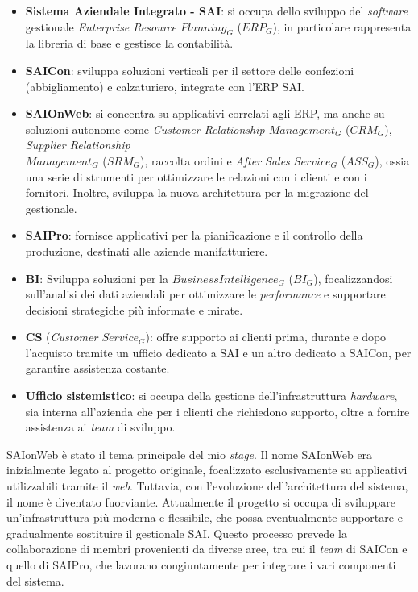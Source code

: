     \begin{itemize}
        \item \textbf{Sistema Aziendale Integrato - SAI}: si occupa dello sviluppo del \textit{software} gestionale \textit{Enterprise Resource $Planning_G$} ($ERP_G$), in particolare rappresenta la libreria di base e gestisce la contabilità.
        \item \textbf{SAICon}: sviluppa soluzioni verticali per il settore delle confezioni (abbigliamento) e calzaturiero, integrate con l'ERP SAI.
        \item \textbf{SAIOnWeb}: si concentra su applicativi correlati agli ERP, ma anche su soluzioni autonome come \textit{Customer Relationship $Management_G$} ($CRM_G$), \textit{Supplier Relationship \\
        $Management_G$} ($SRM_G$), raccolta ordini e \textit{After Sales $Service_G$} ($ASS_G$), ossia una serie di strumenti per ottimizzare le relazioni con i clienti e con i fornitori. Inoltre, sviluppa la nuova architettura per la migrazione del gestionale.
        \item \textbf{SAIPro}: fornisce applicativi per la pianificazione e il controllo della produzione, destinati alle aziende manifatturiere.
        \item \textbf{BI}: Sviluppa soluzioni per la \textit{$Business Intelligence_G$} ($BI_G$), focalizzandosi sull'analisi dei dati aziendali per ottimizzare le \textit{performance} e supportare decisioni strategiche più informate e mirate. 
        \item \textbf{CS} (\textit{Customer $Service_G$}): offre supporto ai clienti prima, durante e dopo l'acquisto tramite un ufficio dedicato a SAI e un altro dedicato a SAICon, per garantire assistenza costante.
        \item \textbf{Ufficio sistemistico}: si occupa della gestione dell'infrastruttura \textit{hardware}, sia interna all'azienda che per i clienti che richiedono supporto, oltre a fornire assistenza ai \textit{team} di sviluppo.
    \end{itemize}
    
    \noindent SAIonWeb è stato il tema principale del mio \textit{stage}. Il nome SAIonWeb era inizialmente legato al progetto originale, focalizzato esclusivamente su applicativi utilizzabili tramite il \textit{web}. Tuttavia, con l'evoluzione dell'architettura del sistema, il nome è diventato fuorviante. Attualmente il progetto si occupa di sviluppare un'infrastruttura più moderna e flessibile, che possa eventualmente supportare e gradualmente sostituire il gestionale SAI. 
    Questo processo prevede la collaborazione di membri provenienti da diverse aree, tra cui il \textit{team} di SAICon e quello di SAIPro, che lavorano congiuntamente per integrare i vari componenti del sistema.\\


